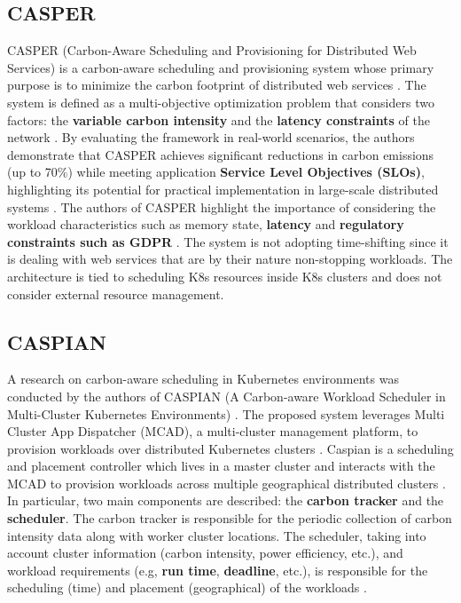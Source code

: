 
\subsection{CASPER}

CASPER (Carbon-Aware Scheduling and Provisioning for Distributed Web Services) is a carbon-aware scheduling and provisioning system whose primary purpose is to minimize the carbon footprint of distributed web services \cite{Souza_2023}.
The system is defined as a multi-objective optimization problem that considers two factors: the \textbf{variable carbon intensity} and the \textbf{latency constraints} of the network \cite{Souza_2023}.
By evaluating the framework in real-world scenarios, the authors demonstrate that CASPER achieves significant reductions in carbon emissions (up to 70\%) while meeting application \textbf{Service Level Objectives (SLOs)}, highlighting its potential for practical implementation in large-scale distributed systems \cite{Souza_2023}.
The authors of CASPER highlight the importance of considering the workload characteristics such as memory state, \textbf{latency} and \textbf{regulatory constraints such as GDPR} \cite{Souza_2023}.
The system is not adopting time-shifting since it is dealing with web services that are by their nature non-stopping workloads. The architecture is tied to scheduling K8s resources inside K8s clusters and does not consider external resource management.

\subsection{CASPIAN}

A research on carbon-aware scheduling in Kubernetes environments was conducted by the authors of CASPIAN (A Carbon-aware Workload Scheduler in Multi-Cluster Kubernetes Environments) \cite{10786568}.
The proposed system leverages Multi Cluster App Dispatcher (MCAD), a multi-cluster management platform, to provision workloads over distributed Kubernetes clusters \cite{10786568}.
Caspian is a scheduling and placement controller which lives in a master cluster and interacts with the MCAD to provision workloads across multiple geographical distributed clusters \cite{10786568}.
In particular, two main components are described: the \textbf{carbon tracker} and the \textbf{scheduler}.
The carbon tracker is responsible for the periodic collection of carbon intensity data along with worker cluster locations.
The scheduler, taking into account cluster information (carbon intensity, power efficiency, etc.), and workload requirements (e.g, \textbf{run time}, \textbf{deadline}, etc.), is responsible for the scheduling (time) and placement (geographical) of the workloads \cite{10786568}.


